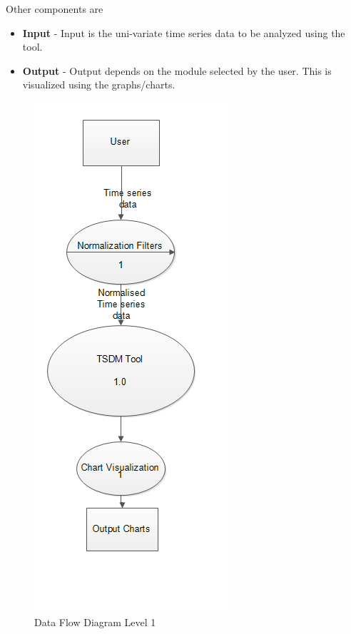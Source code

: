 \documentclass[12pt,a4paper]{report}
\begin{document}
\noindent
Other components are 
\begin{itemize}
\item \textbf{Input } - Input is the uni-variate time series data to be analyzed using the tool.
\item \textbf{Output } - Output depends on the module selected by the user. This is visualized using the graphs/charts.
\end{itemize}
\begin{figure}[h!]
	\centering
		\includegraphics[scale=0.85]{screenshots/dfd_new_1.png}
		\caption{Data Flow Diagram Level 1}
\end{figure}
\end{document}
